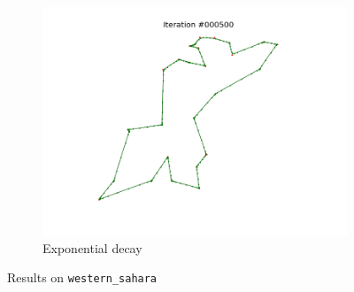 \documentclass[11pt]{article}
\begin{document}
\begin{figure}
\begin{subfigure}{.33\textwidth}
  \includegraphics[trim={4cm 2cm 4cm 2cm}, clip=true,width=\linewidth]{w_e.png}
  \caption{Exponential decay}
  \label{fig:we}
\end{subfigure}
\caption{Results on \texttt{western\_sahara}}
\label{fig:sahara}
\end{figure}
\end{document}
